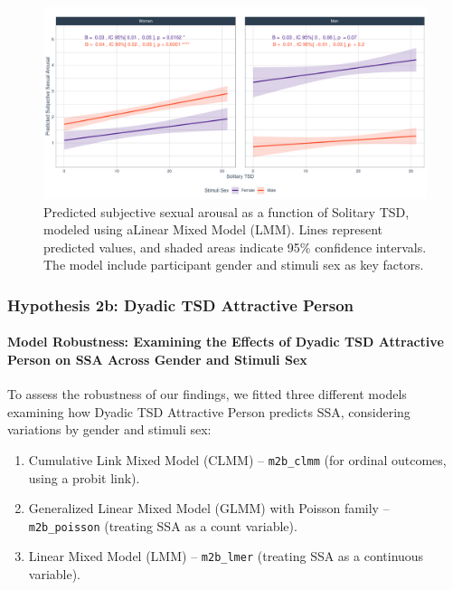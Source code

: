 \documentclass[
  bookmarksnumbered]{article}
\providecommand{\tightlist}{%
  \setlength{\itemsep}{0pt}\setlength{\parskip}{0pt}}
\begin{document}
\begin{figure}
\centering
\includegraphics{Sexual_Desire_Arousal_files/figure-latex/fig-h2a-1.pdf}
\caption{\label{fig:fig-h2a}Predicted subjective sexual arousal as a function of Solitary TSD, modeled using aLinear Mixed Model (LMM). Lines represent predicted values, and shaded areas indicate 95\% confidence intervals. The model include participant gender and stimuli sex as key factors.}
\end{figure}

\subsubsection{Hypothesis 2b: Dyadic TSD Attractive Person}\label{hyp2b}

\paragraph{Model Robustness: Examining the Effects of Dyadic TSD Attractive Person on SSA Across Gender and Stimuli Sex}\label{model-robustness-examining-the-effects-of-dyadic-tsd-attractive-person-on-ssa-across-gender-and-stimuli-sex}

To assess the robustness of our findings, we fitted three different models examining how Dyadic TSD Attractive Person predicts SSA, considering variations by gender and stimuli sex:

\begin{enumerate}
\def\labelenumi{\arabic{enumi}.}
\tightlist
\item
  Cumulative Link Mixed Model (CLMM) -- \texttt{m2b\_clmm} (for ordinal outcomes, using a probit link).
\item
  Generalized Linear Mixed Model (GLMM) with Poisson family -- \texttt{m2b\_poisson} (treating SSA as a count variable).
\item
  Linear Mixed Model (LMM) -- \texttt{m2b\_lmer} (treating SSA as a continuous variable).
\end{enumerate}
\end{document}
